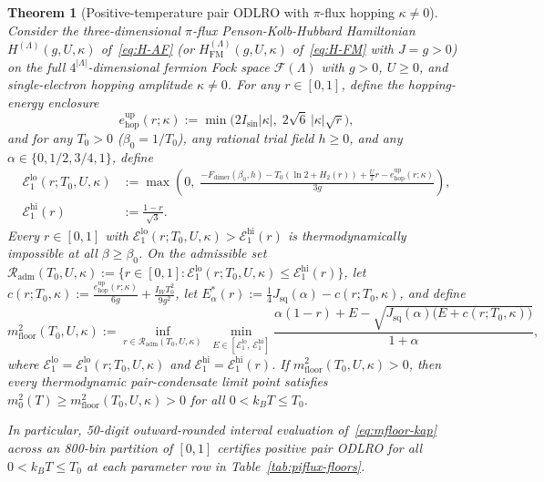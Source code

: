 \documentclass[11pt]{article}
\newtheorem{theorem}{Theorem}[section]
\theoremstyle{definition}
\theoremstyle{remark}
\newcommand{\calF}{\mathcal{F}}
\newcommand{\calE}{\mathcal{E}}
\begin{document}
\begin{theorem}[Positive-temperature pair ODLRO with $\pi$-flux hopping $\kappa \ne 0$]\label{thm:piflux}
Consider the three-dimensional $\pi$-flux Penson-Kolb-Hubbard Hamiltonian $H^{(\Lambda)}(g, U, \kappa)$ of~\eqref{eq:H-AF} (or $H_{\mathrm{FM}}^{(\Lambda)}(g, U, \kappa)$ of~\eqref{eq:H-FM} with $J = g > 0$) on the full $4^{|\Lambda|}$-dimensional fermion Fock space $\calF(\Lambda)$ with $g > 0$, $U \ge 0$, and single-electron hopping amplitude $\kappa \ne 0$. For any $r \in [0, 1]$, define the hopping-energy enclosure
\begin{equation}\label{eq:ehop-up}
e_{\mathrm{hop}}^{\mathrm{up}}(r; \kappa) := \min\!\Big(2 I_{\sin}|\kappa|,\; 2\sqrt{6}\,|\kappa|\sqrt{r}\Big),
\end{equation}
and for any $T_0 > 0$ ($\beta_0 = 1/T_0$), any rational trial field $h \ge 0$, and any $\alpha \in \{0, 1/2, 3/4, 1\}$, define
\begin{equation}\label{eq:E1-bounds-kap}
\begin{aligned}
\calE_1^{\mathrm{lo}}(r; T_0, U, \kappa) &:= \max\!\left(0,\; \frac{-F_{\mathrm{dimer}}(\beta_0, h) - T_0(\ln 2 + H_2(r)) + \frac{U}{2}r - e_{\mathrm{hop}}^{\mathrm{up}}(r; \kappa)}{3g}\right), \\
\calE_1^{\mathrm{hi}}(r) &:= \frac{1 - r}{\sqrt{3}}.
\end{aligned}
\end{equation}
Every $r \in [0, 1]$ with $\calE_1^{\mathrm{lo}}(r; T_0, U, \kappa) > \calE_1^{\mathrm{hi}}(r)$ is thermodynamically impossible at all $\beta \ge \beta_0$. On the admissible set $\mathcal{R}_{\mathrm{adm}}(T_0, U, \kappa) := \{r \in [0, 1] : \calE_1^{\mathrm{lo}}(r; T_0, U, \kappa) \le \calE_1^{\mathrm{hi}}(r)\}$, let $c(r; T_0, \kappa) := \frac{e_{\mathrm{hop}}^{\mathrm{up}}(r; \kappa)}{6g} + \frac{I_W T_0^2}{9g^2}$, let $E_\alpha^*(r) := \frac{1}{4}J_{\mathrm{sq}}(\alpha) - c(r; T_0, \kappa)$, and define
\begin{equation}\label{eq:mfloor-kap}
m_{\mathrm{floor}}^2(T_0, U, \kappa) := \inf_{r \in \mathcal{R}_{\mathrm{adm}}(T_0, U, \kappa)} \;\min_{E \in [\calE_1^{\mathrm{lo}},\, \calE_1^{\mathrm{hi}}]} \frac{\alpha(1 - r) + E - \sqrt{J_{\mathrm{sq}}(\alpha)\bigl(E + c(r; T_0, \kappa)\bigr)}}{1 + \alpha},
\end{equation}
where $\calE_1^{\mathrm{lo}} = \calE_1^{\mathrm{lo}}(r; T_0, U, \kappa)$ and $\calE_1^{\mathrm{hi}} = \calE_1^{\mathrm{hi}}(r)$.
If $m_{\mathrm{floor}}^2(T_0, U, \kappa) > 0$, then every thermodynamic pair-condensate limit point satisfies $m_0^2(T) \ge m_{\mathrm{floor}}^2(T_0, U, \kappa) > 0$ for \emph{all} $0 < k_B T \le T_0$.

In particular, 50-digit outward-rounded interval evaluation of~\eqref{eq:mfloor-kap} across an 800-bin partition of $[0, 1]$ certifies positive pair ODLRO for all $0 < k_B T \le T_0$ at each parameter row in Table~\ref{tab:piflux-floors}.
\end{theorem}
\end{document}
